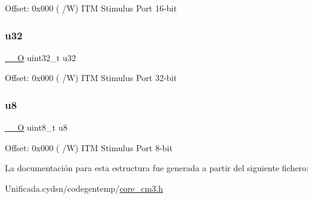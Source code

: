 Offset\+: 0x000 ( /W) I\+TM Stimulus Port 16-\/bit \mbox{\label{struct_i_t_m___type_acaf6d0e14a3d4b541c624913b4a1931e}} 
\subsubsection{\texorpdfstring{u32}{u32}}
{\footnotesize\ttfamily \mbox{\hyperlink{core__cm3_8h_a7e25d9380f9ef903923964322e71f2f6}{\+\_\+\+\_\+O}} uint32\+\_\+t u32}

Offset\+: 0x000 ( /W) I\+TM Stimulus Port 32-\/bit \mbox{\label{struct_i_t_m___type_a0374c0b98ab9de6f71fabff7412df832}} 
\subsubsection{\texorpdfstring{u8}{u8}}
{\footnotesize\ttfamily \mbox{\hyperlink{core__cm3_8h_a7e25d9380f9ef903923964322e71f2f6}{\+\_\+\+\_\+O}} uint8\+\_\+t u8}

Offset\+: 0x000 ( /W) I\+TM Stimulus Port 8-\/bit 

La documentación para esta estructura fue generada a partir del siguiente fichero\+:\begin{DoxyCompactItemize}
\item 
Unificada.\+cydsn/codegentemp/\mbox{\hyperlink{core__cm3_8h}{core\+\_\+cm3.\+h}}\end{DoxyCompactItemize}
